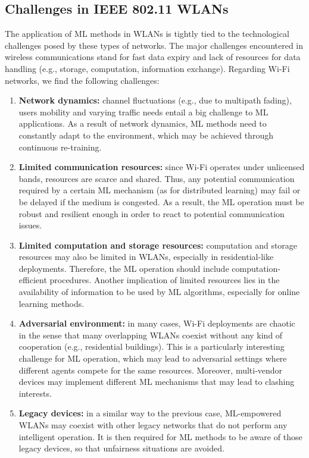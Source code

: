 \documentclass[journal]{IEEEtran}
\begin{document}
\subsection{Challenges in IEEE 802.11 WLANs}
\label{section:ieee_80211_wlans}
The application of ML methods in WLANs is tightly tied to the technological challenges posed by these types of networks. The major challenges encountered in wireless communications stand for fast data expiry and lack of resources for data handling (e.g., storage, computation, information exchange). Regarding Wi-Fi networks, we find the following challenges:
\begin{enumerate}
	\item \textbf{Network dynamics:} channel fluctuations (e.g., due to multipath fading), users mobility and varying traffic needs entail a big challenge to ML applications. As a result of network dynamics, ML methods need to constantly adapt to the environment, which may be achieved through continuous re-training.
	\item \textbf{Limited communication resources:} since Wi-Fi operates under unlicensed bands, resources are scarce and shared. Thus, any potential communication required by a certain ML mechanism (as for distributed learning) may fail or be delayed if the medium is congested. As a result, the ML operation must be robust and resilient enough in order to react to potential communication issues.
	\item \textbf{Limited computation and storage resources:} computation and storage resources may also be limited in WLANs, especially in residential-like deployments. Therefore, the ML operation should include computation-efficient procedures. Another implication of limited resources lies in the availability of information to be used by ML algorithms, especially for online learning methods.
	\item \textbf{Adversarial environment:} in many cases, Wi-Fi deployments are chaotic in the sense that many overlapping WLANs coexist without any kind of cooperation (e.g., residential buildings). This is a particularly interesting challenge for ML operation, which may lead to adversarial settings where different agents compete for the same resources. Moreover, multi-vendor devices may implement different ML mechanisms that may lead to clashing interests.
	\item \textbf{Legacy devices:} in a similar way to the previous case, ML-empowered WLANs may coexist with other legacy networks that do not perform any intelligent operation. It is then required for ML methods to be aware of those legacy devices, so that unfairness situations are avoided.
\end{enumerate}
\end{document}
